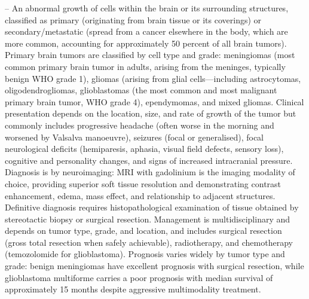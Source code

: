 -- An abnormal growth of cells within the brain or its surrounding structures, classified as primary (originating from brain tissue or its coverings) or secondary/metastatic (spread from a cancer elsewhere in the body, which are more common, accounting for approximately 50 percent of all brain tumors). Primary brain tumors are classified by cell type and grade: meningiomas (most common primary brain tumor in adults, arising from the meninges, typically benign WHO grade 1), gliomas (arising from glial cells—including astrocytomas, oligodendrogliomas, glioblastomas (the most common and most malignant primary brain tumor, WHO grade 4), ependymomas, and mixed gliomas. Clinical presentation depends on the location, size, and rate of growth of the tumor but commonly includes progressive headache (often worse in the morning and worsened by Valsalva manoeuvre), seizures (focal or generalised), focal neurological deficits (hemiparesis, aphasia, visual field defects, sensory loss), cognitive and personality changes, and signs of increased intracranial pressure. Diagnosis is by neuroimaging: MRI with gadolinium is the imaging modality of choice, providing superior soft tissue resolution and demonstrating contrast enhancement, edema, mass effect, and relationship to adjacent structures. Definitive diagnosis requires histopathological examination of tissue obtained by stereotactic biopsy or surgical resection. Management is multidisciplinary and depends on tumor type, grade, and location, and includes surgical resection (gross total resection when safely achievable), radiotherapy, and chemotherapy (temozolomide for glioblastoma). Prognosis varies widely by tumor type and grade: benign meningiomas have excellent prognosis with surgical resection, while glioblastoma multiforme carries a poor prognosis with median survival of approximately 15 months despite aggressive multimodality treatment.

